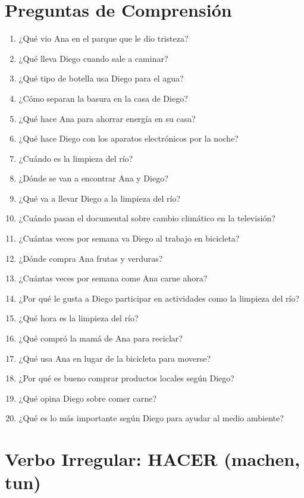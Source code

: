 \documentclass[12pt,a4paper]{article}
\begin{document}
\newpage

\section*{Preguntas de Comprensión}

\begin{enumerate}[leftmargin=*]
    \item ¿Qué vio Ana en el parque que le dio tristeza?
    \item ¿Qué lleva Diego cuando sale a caminar?
    \item ¿Qué tipo de botella usa Diego para el agua?
    \item ¿Cómo separan la basura en la casa de Diego?
    \item ¿Qué hace Ana para ahorrar energía en su casa?
    \item ¿Qué hace Diego con los aparatos electrónicos por la noche?
    \item ¿Cuándo es la limpieza del río?
    \item ¿Dónde se van a encontrar Ana y Diego?
    \item ¿Qué va a llevar Diego a la limpieza del río?
    \item ¿Cuándo pasan el documental sobre cambio climático en la televisión?
    \item ¿Cuántas veces por semana va Diego al trabajo en bicicleta?
    \item ¿Dónde compra Ana frutas y verduras?
    \item ¿Cuántas veces por semana come Ana carne ahora?
    \item ¿Por qué le gusta a Diego participar en actividades como la limpieza del río?
    \item ¿Qué hora es la limpieza del río?
    \item ¿Qué compró la mamá de Ana para reciclar?
    \item ¿Qué usa Ana en lugar de la bicicleta para moverse?
    \item ¿Por qué es bueno comprar productos locales según Diego?
    \item ¿Qué opina Diego sobre comer carne?
    \item ¿Qué es lo más importante según Diego para ayudar al medio ambiente?
\end{enumerate}

\newpage

\section*{Verbo Irregular: HACER (machen, tun)}
\end{document}
